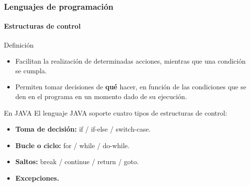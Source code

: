 \documentclass{beamer}
\begin{document}
		\begin{frame}
			\frametitle{Lenguajes de programaci\'on}
			\framesubtitle{Estructuras de control}

			{\scriptsize
			\begin{block}{Definici\'on}
				\begin{itemize}
  					\item Facilitan la realizaci\'on de determinadas acciones, mientras que una condici\'on se cumpla. 
					\item Permiten tomar decisiones de \textbf{qu\'e} hacer, en funci\'on de las condiciones que se den en el programa en un momento dado de su ejecuci\'on.
				\end{itemize}
			\end{block}
			\begin{exampleblock}{En JAVA}
				El lenguaje JAVA soporte cuatro tipos de estructuras de control:
				\begin{itemize}
					\item \textbf{Toma de decisi\'on:} if / if-else / switch-case.
					\item \textbf{Bucle o ciclo:} for / while / do-while.
					\item \textbf{Saltos:} break / continue / return / goto.
					\item \textbf{Excepciones.}
				\end{itemize}
			\end{exampleblock}
			}
		\end{frame}
\end{document}
